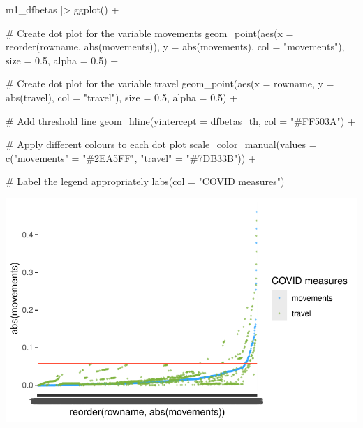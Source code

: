 \documentclass[
  letterpaper,
]{krantz}
\makeatletter
\newenvironment{Shaded}{\begin{snugshade}}{\end{snugshade}}
\newcommand{\AttributeTok}[1]{\textcolor[rgb]{0.40,0.45,0.13}{#1}}
\newcommand{\CommentTok}[1]{\textcolor[rgb]{0.37,0.37,0.37}{#1}}
\newcommand{\FloatTok}[1]{\textcolor[rgb]{0.68,0.00,0.00}{#1}}
\newcommand{\FunctionTok}[1]{\textcolor[rgb]{0.28,0.35,0.67}{#1}}
\newcommand{\NormalTok}[1]{\textcolor[rgb]{0.00,0.23,0.31}{#1}}
\newcommand{\OtherTok}[1]{\textcolor[rgb]{0.00,0.23,0.31}{#1}}
\newcommand{\SpecialCharTok}[1]{\textcolor[rgb]{0.37,0.37,0.37}{#1}}
\newcommand{\StringTok}[1]{\textcolor[rgb]{0.13,0.47,0.30}{#1}}
\newenvironment{kframe}{%
\medskip{}
\setlength{\fboxsep}{.8em}
 \def\at@end@of@kframe{}%
 \ifinner\ifhmode%
  \def\at@end@of@kframe{\end{minipage}}%
  \begin{minipage}{\columnwidth}%
 \fi\fi%
 \def\FrameCommand##1{\hskip\@totalleftmargin \hskip-\fboxsep
 \colorbox{shadecolor}{##1}\hskip-\fboxsep
     \hskip-\linewidth \hskip-\@totalleftmargin \hskip\columnwidth}%
 \MakeFramed {\advance\hsize-\width
   \@totalleftmargin\z@ \linewidth\hsize
   \@setminipage}}%
 {\par\unskip\endMakeFramed%
 \at@end@of@kframe}
\renewenvironment{Shaded}{\begin{kframe}}{\end{kframe}}
\makeatother
\begin{document}
\begin{Shaded}
\begin{Highlighting}[]
\NormalTok{m1\_dfbetas }\SpecialCharTok{|\textgreater{}}
  \FunctionTok{ggplot}\NormalTok{() }\SpecialCharTok{+}
  
  \CommentTok{\# Create dot plot for the variable movements}
  \FunctionTok{geom\_point}\NormalTok{(}\FunctionTok{aes}\NormalTok{(}\AttributeTok{x =} \FunctionTok{reorder}\NormalTok{(rowname, }\FunctionTok{abs}\NormalTok{(movements)),}
                 \AttributeTok{y =} \FunctionTok{abs}\NormalTok{(movements),}
                 \AttributeTok{col =} \StringTok{"movements"}\NormalTok{),}
             \AttributeTok{size =} \FloatTok{0.5}\NormalTok{,}
             \AttributeTok{alpha =} \FloatTok{0.5}\NormalTok{) }\SpecialCharTok{+}
  
  \CommentTok{\# Create dot plot for the variable travel}
  \FunctionTok{geom\_point}\NormalTok{(}\FunctionTok{aes}\NormalTok{(}\AttributeTok{x =}\NormalTok{ rowname,}
                 \AttributeTok{y =} \FunctionTok{abs}\NormalTok{(travel),}
                 \AttributeTok{col =} \StringTok{"travel"}\NormalTok{),}
             \AttributeTok{size =} \FloatTok{0.5}\NormalTok{,}
             \AttributeTok{alpha =} \FloatTok{0.5}\NormalTok{) }\SpecialCharTok{+}
  
  \CommentTok{\# Add threshold line}
  \FunctionTok{geom\_hline}\NormalTok{(}\AttributeTok{yintercept =}\NormalTok{ dfbetas\_th, }\AttributeTok{col =} \StringTok{"\#FF503A"}\NormalTok{) }\SpecialCharTok{+}
  
  \CommentTok{\# Apply different colours to each dot plot}
  \FunctionTok{scale\_color\_manual}\NormalTok{(}\AttributeTok{values =} \FunctionTok{c}\NormalTok{(}\StringTok{"movements"} \OtherTok{=} \StringTok{"\#2EA5FF"}\NormalTok{,}
                                \StringTok{"travel"} \OtherTok{=} \StringTok{"\#7DB33B"}\NormalTok{)) }\SpecialCharTok{+}

  \CommentTok{\# Label the legend appropriately}
  \FunctionTok{labs}\NormalTok{(}\AttributeTok{col =} \StringTok{"COVID measures"}\NormalTok{)}
\end{Highlighting}
\end{Shaded}

\includegraphics{13_regressions_files/figure-latex/dfbetas-plot-outliers-alternative-1.pdf}
\end{document}
